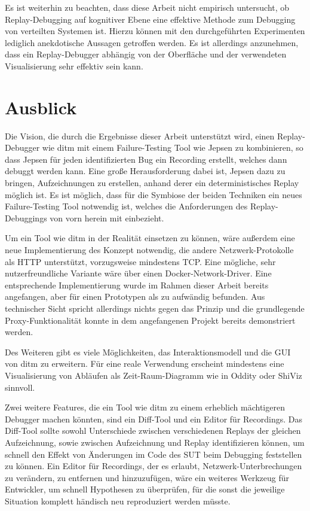 \documentclass[12pt,a4paper]{report}
\begin{document}
Es ist weiterhin zu beachten, dass diese Arbeit nicht empirisch untersucht, ob Replay-Debugging auf kognitiver Ebene eine
effektive Methode zum Debugging von verteilten Systemen ist. Hierzu können mit den durchgeführten Experimenten lediglich
anekdotische Aussagen getroffen werden. Es ist allerdings anzunehmen, dass ein Replay-Debugger abhängig von der Oberfläche und der
verwendeten Visualisierung sehr effektiv sein kann.

\section{Ausblick}
Die Vision, die durch die Ergebnisse dieser Arbeit unterstützt wird, einen Replay-Debugger wie ditm mit einem Failure-Testing Tool
wie Jepsen zu kombinieren, so dass Jepsen für jeden identifizierten Bug ein Recording erstellt, welches dann debuggt werden kann.
Eine große Herausforderung dabei ist, Jepsen dazu zu bringen, Aufzeichnungen zu erstellen, anhand derer ein deterministisches
Replay möglich ist. Es ist möglich, dass für die Symbiose der beiden Techniken ein neues Failure-Testing Tool notwendig ist,
welches die Anforderungen des Replay-Debuggings von vorn herein mit einbezieht.

Um ein Tool wie ditm in der Realität einsetzen zu können, wäre außerdem eine neue Implementierung des Konzept notwendig, die
andere Netzwerk-Protokolle als HTTP unterstützt, vorzugsweise mindestens TCP. Eine mögliche, sehr nutzerfreundliche Variante wäre
über einen Docker-Network-Driver. Eine entsprechende Implementierung wurde im Rahmen dieser Arbeit bereits angefangen, aber für
einen Prototypen als zu aufwändig befunden. Aus technischer Sicht spricht allerdings nichts gegen das Prinzip und die grundlegende
Proxy-Funktionalität konnte in dem angefangenen Projekt bereits demonstriert werden.

Des Weiteren gibt es viele Möglichkeiten, das Interaktionsmodell und die GUI von ditm zu erweitern. Für eine reale Verwendung
erscheint mindestens eine Visualisierung von Abläufen als Zeit-Raum-Diagramm wie in Oddity \cite{oddity_graphical_debugger} oder
ShiViz \cite{ShiViz_visual_debugger} sinnvoll.

Zwei weitere Features, die ein Tool wie ditm zu einem erheblich mächtigeren Debugger machen könnten, sind ein Diff-Tool und ein
Editor für Recordings. Das Diff-Tool sollte sowohl Unterschiede zwischen verschiedenen Replays der gleichen Aufzeichnung, sowie
zwischen Aufzeichnung und Replay identifizieren können, um schnell den Effekt von Änderungen im Code des SUT beim Debugging
feststellen zu können. Ein Editor für Recordings, der es erlaubt, Netzwerk-Unterbrechungen zu verändern, zu entfernen und
hinzuzufügen, wäre ein weiteres Werkzeug für Entwickler, um schnell Hypothesen zu überprüfen, für die sonst die jeweilige
Situation komplett händisch neu reproduziert werden müsste.
\end{document}
